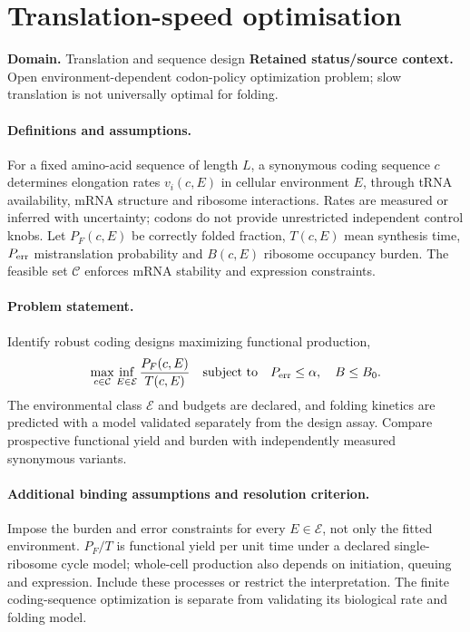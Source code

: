 \documentclass[11pt]{article}
\begin{document}
\section*{Translation-speed optimisation}
\label{prob:098}
\label{rank:228}
\par\smallskip

\noindent\textbf{Domain.} Translation and sequence design \quad \textbf{Retained status/source context.} Open environment-dependent codon-policy optimization problem; slow translation is not universally optimal for folding.
\paragraph{Definitions and assumptions.} For a fixed amino-acid sequence of length $L$, a synonymous coding sequence $c$ determines elongation rates $v_i(c,E)$ in cellular environment $E$, through tRNA availability, mRNA structure and ribosome interactions. Rates are measured or inferred with uncertainty; codons do not provide unrestricted independent control knobs. Let $P_F(c,E)$ be correctly folded fraction, $T(c,E)$ mean synthesis time, $P_{
\rm err}$ mistranslation probability and $B(c,E)$ ribosome occupancy burden. The feasible set $\mathcal C$ enforces mRNA stability and expression constraints.
\paragraph{Problem statement.} Identify robust coding designs maximizing functional production,
\[\max_{c\in\mathcal C}\inf_{E\in\mathcal E}\frac{P_F(c,E)}{T(c,E)}\quad\text{subject to}\quad P_{\rm err}\le\alpha,\quad B\le B_0.\]
The environmental class $\mathcal E$ and budgets are declared, and folding kinetics are predicted with a model validated separately from the design assay. Compare prospective functional yield and burden with independently measured synonymous variants.
\paragraph{Additional binding assumptions and resolution criterion.} Impose the burden and error constraints for every $E\in\mathcal E$, not only the fitted environment. $P_F/T$ is functional yield per unit time under a declared single-ribosome cycle model; whole-cell production also depends on initiation, queuing and expression. Include these processes or restrict the interpretation. The finite coding-sequence optimization is separate from validating its biological rate and folding model.
\end{document}
